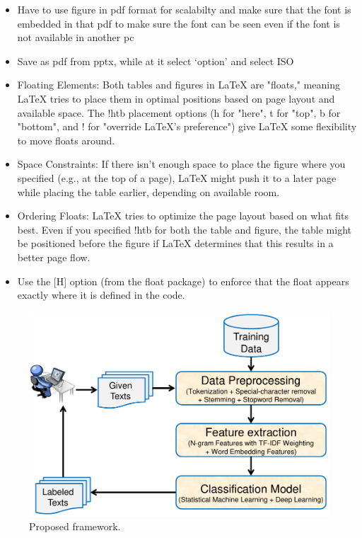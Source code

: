 \documentclass[11pt]{article}
\begin{document}
\begin{itemize}
\item Have to use figure in pdf format for scalabilty and make sure that the font is embedded in that pdf to make sure the font can be seen even if the font is not available in another pc
\item Save as pdf from pptx, while at it select `option' and select ISO
\item Floating Elements: Both tables and figures in LaTeX are "floats," meaning LaTeX tries to place them in optimal positions based on page layout and available space. The !htb placement options (h for "here", t for "top", b for "bottom", and ! for "override LaTeX's preference") give LaTeX some flexibility to move floats around.

\item Space Constraints: If there isn't enough space to place the figure where you specified (e.g., at the top of a page), LaTeX might push it to a later page while placing the table earlier, depending on available room.

\item Ordering Floats: LaTeX tries to optimize the page layout based on what fits best. Even if you specified !htb for both the table and figure, the table might be positioned before the figure if LaTeX determines that this results in a better page flow.
\item Use the [H] option (from the float package) to enforce that the float appears exactly where it is defined in the code.
\end{itemize}


\begin{figure}[!h] %
\centering %
\includegraphics[width=0.7\linewidth]{ExampleSlide.pdf}
\caption{Proposed framework.}
\label{fig:overview}
\end{figure}
\end{document}
